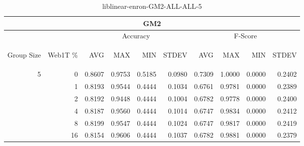 \begin{center}
\begin{table}[htbp]
\begin{tabular}{ | r | r | r | r | r | r | r | r | r | r |}
\hline
\multicolumn{10}{|c|}{GM2}\\
\hline
 & & \multicolumn{4}{|c|}{Accuracy} & \multicolumn{4}{|c|}{F-Score}\\ \cline{3-10}
\begin{sideways}Group Size\end{sideways} & \begin{sideways}Web1T \%\end{sideways} & \begin{sideways}AVG\end{sideways} & \begin{sideways}MAX\end{sideways} & \begin{sideways}MIN\end{sideways} & \begin{sideways}STDEV\end{sideways} & \begin{sideways}AVG\end{sideways} & \begin{sideways}MAX\end{sideways} & \begin{sideways}MIN\end{sideways} & \begin{sideways}STDEV\end{sideways}\\
\hline
\multirow{5}{*}{5}
 & 0 & 0.8607 & 0.9753 & 0.5185 & 0.0980 & 0.7309 & 1.0000 & 0.0000 & 0.2402\\ \cline{2-10}
 & 1 & 0.8193 & 0.9544 & 0.4444 & 0.1034 & 0.6761 & 0.9781 & 0.0000 & 0.2389\\ \cline{2-10}
 & 2 & 0.8192 & 0.9448 & 0.4444 & 0.1004 & 0.6782 & 0.9778 & 0.0000 & 0.2400\\ \cline{2-10}
 & 4 & 0.8187 & 0.9560 & 0.4444 & 0.1014 & 0.6747 & 0.9834 & 0.0000 & 0.2412\\ \cline{2-10}
 & 8 & 0.8199 & 0.9547 & 0.4444 & 0.1024 & 0.6747 & 0.9817 & 0.0000 & 0.2419\\ \cline{2-10}
 & 16 & 0.8154 & 0.9606 & 0.4444 & 0.1037 & 0.6782 & 0.9881 & 0.0000 & 0.2379\\ \cline{2-10}
\hline
\end{tabular}
\caption{liblinear-enron-GM2-ALL-ALL-5}
\label{table:liblinear-enron-GM2-ALL-ALL-5}
\end{table}
\end{center}

